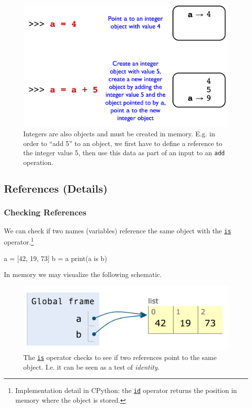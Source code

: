 \documentclass[12pt,letterpaper,twoside]{article}
\begin{document}
\begin{enumerate}
\begin{figure}[h]
\centering
\includegraphics[scale=0.35]{fig/references-example-2.png}
\caption{\small Integers are also objects and must be created in memory. E.g. in order to ``add 5'' to an object, 
we first have to define a reference to the integer value 5, then use this data as part of an input to an \texttt{add} operation.}
\end{figure}

\subsection{References (Details)}
\subsubsection{Checking References}
We can check if two names (variables) reference the same object with the
\href{https://docs.python.org/3/library/operator.html}{\texttt{is}} operator.\footnote{
Implementation detail in CPython: 
the \href{https://docs.python.org/3/library/functions.html#id}{\texttt{id}} operator 
returns the position in memory where the object is stored.
}

\begin{python}
a = [42, 19, 73]
b = a
print(a is b)
\end{python}

In memory we may visualize the following schematic.

\begin{figure}[h]
\centering
\includegraphics[scale=0.5]{fig/list-1.png}
\caption{The \href{https://docs.python.org/3/library/operator.html}{\texttt{is}} operator checks to see if two references point to the same object. I.e. it can be seen as a test of \emph{identity}.}
\end{figure}


\end{enumerate}
\end{document}
